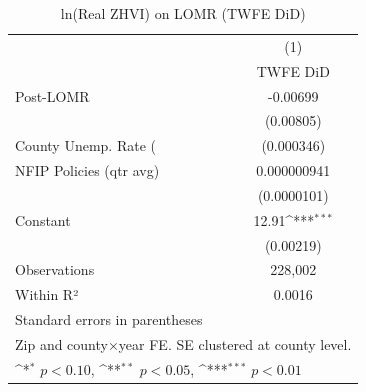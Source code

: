 \begin{table}[htbp]\centering
\def\sym#1{\ifmmode^{#1}\else\(^{#1}\)\fi}
\caption{ln(Real ZHVI) on LOMR (TWFE DiD)}
\label{tab:twfe}
\begin{tabular}{l*{1}{c}}
\hline\hline
                    &\multicolumn{1}{c}{(1)}\\
                    &\multicolumn{1}{c}{TWFE DiD}\\
\hline
Post-LOMR           &    -0.00699         \\
                    &   (0.00805)         \\
[0.3em]
County Unemp. Rate (%
                    &  (0.000346)         \\
[0.3em]
NFIP Policies (qtr avg)& 0.000000941         \\
                    & (0.0000101)         \\
[0.3em]
Constant            &       12.91\sym{***}\\
                    &   (0.00219)         \\
\hline
Observations        &     228,002         \\
Within R²           &      0.0016         \\
\hline\hline
\multicolumn{2}{l}{\footnotesize Standard errors in parentheses}\\
\multicolumn{2}{l}{\footnotesize Zip and county×year FE. SE clustered at county level.}\\
\multicolumn{2}{l}{\footnotesize \sym{*} \(p<0.10\), \sym{**} \(p<0.05\), \sym{***} \(p<0.01\)}\\
\end{tabular}
\end{table}
